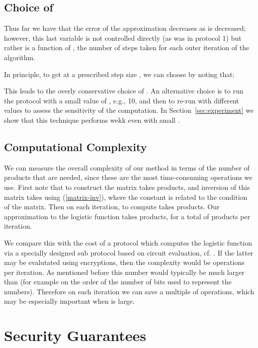 \documentclass[11pt]{article}
\begin{document}
\subsection{Choice of }
Thus far we have that the error of the approximation decreases as  is decreased; however, this last variable is not controlled directly (as  was in protocol 1) but rather is a function of , the number of steps taken for each outer iteration of the algorithm.

In principle, to get at a prescribed step size , we can choose  by noting that:



This leads to the overly conservative choice of .  An alternative choice is to run the protocol with a small value of , e.g., 10, and then to re-run with different values to assess the sensitivity of the computation.  In Section~\ref{sec:experiment} we show that this technique performs wekk even with small .

\subsection{Computational Complexity}

We can measure the overall complexity of our method in terms of the number of products that are needed, since these are the most time-consuming operations we use.  First note that to construct the matrix  takes  products, and inversion of this matrix takes  using (\ref{matrix-inv}), where the constant is related to the condition of the matrix.  Then on each iteration, to compute  takes  products.  Our approximation to the logistic function takes  products, for a total of  products per iteration.


We compare this with the cost of a protocol which computes the logistic function via a specially designed sub protocol based on circuit evaluation, cf. \citet{yao82}.  If the latter may be evalutated using  encryptions, then the complexity would be  operations per iteration.  As mentioned before this number would typically be much larger than  (for example on the order of the number of bits used to represent the numbers).  Therefore on each iteration we can save a multiple of  operations, which may be especially important when  is large.


\section{Security Guarantees}\label{sec:security}
\end{document}
